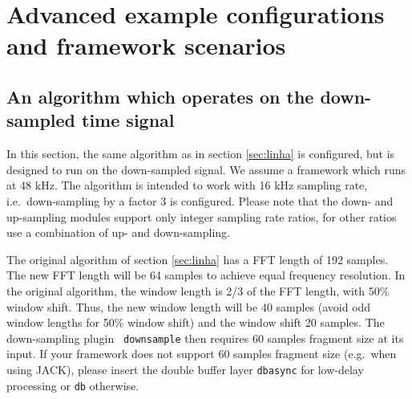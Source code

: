 \section{Advanced example configurations and framework scenarios}%
\label{sec:advancedex}%

\subsection{An algorithm which operates on the down-sampled time signal}%
%
%

In this section, the same algorithm as in section \ref{sec:linha} is
configured, but is designed to run on the down-sampled signal. We
assume a framework which runs at 48 kHz. The algorithm is intended to
work with 16 kHz sampling rate, i.e.\ down-sampling by a factor 3 is
configured. Please note that the down- and up-sampling modules support
only integer sampling rate ratios, for other ratios use a combination
of up- and down-sampling.

The original algorithm of section \ref{sec:linha} has a FFT length of
192 samples. The new FFT length will be 64 samples to achieve equal
frequency resolution. In the original algorithm, the window length is
2/3 of the FFT length, with 50\% window shift. Thus, the new window
length will be 40 samples (avoid odd window lengths for 50\% window
shift) and the window shift 20 samples. The down-sampling plugin {\tt
  downsample} then requires 60 samples fragment size at its input. If
your framework does not support 60 samples fragment size (e.g.\ when
using JACK), please insert the double buffer layer {\tt dbasync} for
low-delay processing or {\tt db} otherwise.

